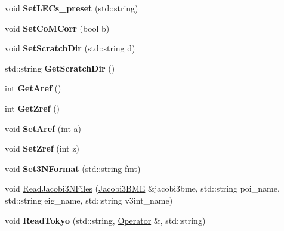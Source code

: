 \begin{DoxyCompactItemize}
\item 
\hypertarget{classReadWrite_a9877fe71d4ed1b4b08bde6a14b10f9b3}{void {\bfseries Set\-L\-E\-Cs\-\_\-preset} (std\-::string)}\label{classReadWrite_a9877fe71d4ed1b4b08bde6a14b10f9b3}

\item 
\hypertarget{classReadWrite_a5e81dd4ce4adfe6fc08af81440003bb9}{void {\bfseries Set\-Co\-M\-Corr} (bool b)}\label{classReadWrite_a5e81dd4ce4adfe6fc08af81440003bb9}

\item 
\hypertarget{classReadWrite_a868c760efc21676c2103e2d7eee840b9}{void {\bfseries Set\-Scratch\-Dir} (std\-::string d)}\label{classReadWrite_a868c760efc21676c2103e2d7eee840b9}

\item 
\hypertarget{classReadWrite_a2df3b9e7d59498ff93b50b8c7053de95}{std\-::string {\bfseries Get\-Scratch\-Dir} ()}\label{classReadWrite_a2df3b9e7d59498ff93b50b8c7053de95}

\item 
\hypertarget{classReadWrite_ab9af15a14bfb94d7be2fbc277271c2ce}{int {\bfseries Get\-Aref} ()}\label{classReadWrite_ab9af15a14bfb94d7be2fbc277271c2ce}

\item 
\hypertarget{classReadWrite_ab99d6e06793182659ef36b5f051e4284}{int {\bfseries Get\-Zref} ()}\label{classReadWrite_ab99d6e06793182659ef36b5f051e4284}

\item 
\hypertarget{classReadWrite_a69b77c047e6a10bb4d05432b3358072f}{void {\bfseries Set\-Aref} (int a)}\label{classReadWrite_a69b77c047e6a10bb4d05432b3358072f}

\item 
\hypertarget{classReadWrite_ab6bb59403464813911d5babb47d8c199}{void {\bfseries Set\-Zref} (int z)}\label{classReadWrite_ab6bb59403464813911d5babb47d8c199}

\item 
\hypertarget{classReadWrite_a53b0601e61a08de12b394aead7917fa0}{void {\bfseries Set3\-N\-Format} (std\-::string fmt)}\label{classReadWrite_a53b0601e61a08de12b394aead7917fa0}

\item 
void \hyperlink{classReadWrite_a063883e780e40f0d40c0574f4c63e041}{Read\-Jacobi3\-N\-Files} (\hyperlink{classJacobi3BME}{Jacobi3\-B\-M\-E} \&jacobi3bme, std\-::string poi\-\_\-name, std\-::string eig\-\_\-name, std\-::string v3int\-\_\-name)
\item 
\hypertarget{classReadWrite_ada225b6c72f911bc2e73017e7423016f}{void {\bfseries Read\-Tokyo} (std\-::string, \hyperlink{classOperator}{Operator} \&, std\-::string)}\label{classReadWrite_ada225b6c72f911bc2e73017e7423016f}


\end{DoxyCompactItemize}
